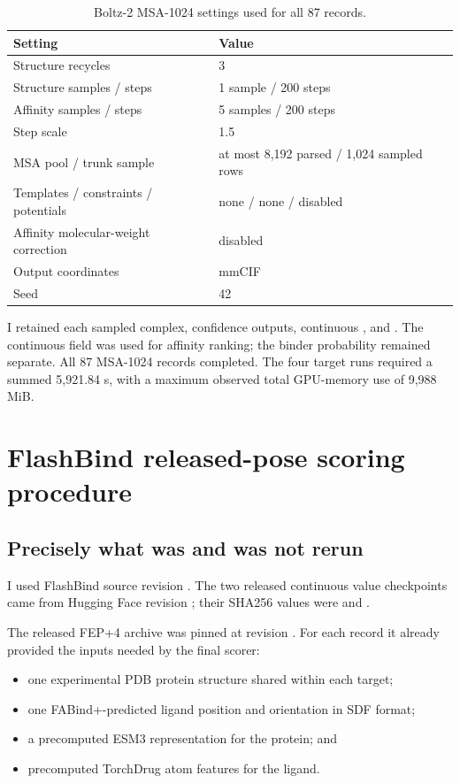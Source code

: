 \documentclass[11pt]{article}
\begin{document}
\begin{table}[H]
\centering
\small
\begin{tabular}{L{2.25in}L{3.85in}}
\toprule
Setting & Value \\
\midrule
Structure recycles & 3 \\
Structure samples / steps & 1 sample / 200 steps \\
Affinity samples / steps & 5 samples / 200 steps \\
Step scale & 1.5 \\
MSA pool / trunk sample & at most 8,192 parsed / 1,024 sampled rows \\
Templates / constraints / potentials & none / none / disabled \\
Affinity molecular-weight correction & disabled \\
Output coordinates & mmCIF \\
Seed & 42 \\
\bottomrule
\end{tabular}
\caption{Boltz-2 MSA-1024 settings used for all 87 records.}
\end{table}

I retained each sampled complex, confidence outputs, continuous
, and .
The continuous field was used for affinity ranking; the binder probability
remained separate. All 87 MSA-1024 records completed. The four target runs
required a summed 5,921.84 s, with a maximum observed total GPU-memory use of
9,988 MiB.

\section{FlashBind released-pose scoring procedure}

\subsection{Precisely what was and was not rerun}

I used FlashBind source revision
\texttt{}. The two released continuous
value checkpoints came from Hugging Face revision
\texttt{}; their SHA256 values were
\texttt{}
and
\texttt{}.

The released FEP+4 archive was pinned at revision
\texttt{}. For each record it already
provided the inputs needed by the final scorer:
\begin{itemize}
  \item one experimental PDB protein structure shared within each target;
  \item one FABind+-predicted ligand position and orientation in SDF format;
  \item a precomputed ESM3 representation for the protein; and
  \item precomputed TorchDrug atom features for the ligand.
\end{itemize}
\end{document}
